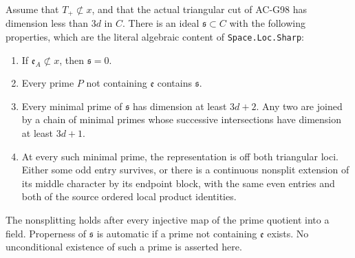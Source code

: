 \begin{theorem}
\label{AC-G105}
Assume that \(T_+\not\subset x\), and that the actual
triangular cut of AC-G98 has dimension less than \(3d\)
in \(C\).  There is an ideal \(\mathfrak s\subset C\)
with the following properties, which are the literal
algebraic content of \texttt{Space.Loc.Sharp}:
\begin{enumerate}
\item If \(\mathfrak e_A\not\subset x\), then
\(\mathfrak s=0\).
\item Every prime \(P\) not containing \(\mathfrak e\)
contains \(\mathfrak s\).
\item Every minimal prime of \(\mathfrak s\) has
dimension at least \(3d+2\).  Any two are joined by a
chain of minimal primes whose successive intersections
have dimension at least \(3d+1\).
\item At every such minimal prime, the representation
is off both triangular loci.  Either some odd entry
survives, or there is a continuous nonsplit extension
of its middle character by its endpoint block, with
the same even entries and both of the source ordered
local product identities.
\end{enumerate}
The nonsplitting holds after every injective map of the
prime quotient into a field.  Properness of
\(\mathfrak s\) is automatic if a prime not containing
\(\mathfrak e\) exists.  No unconditional existence of
such a prime is asserted here.
\end{theorem}

